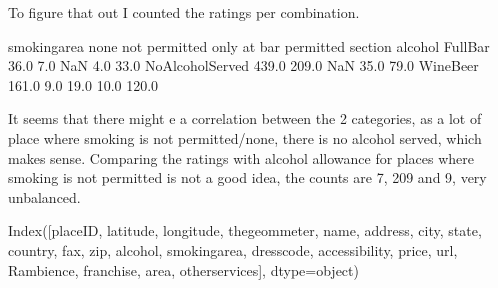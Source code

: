 \documentclass[letterpaper,10pt,english]{jupyterBook}
\begin{document}
\sphinxAtStartPar
To figure that out I counted the ratings per combination.

\begin{sphinxVerbatim}[commandchars=\\\{\}]
\PYG{p}{[}\PYG{p}{]}  
\end{sphinxVerbatim}

\begin{sphinxVerbatim}[commandchars=\\\{\}]
smoking\PYGZus{}area        none  not permitted  only at bar  permitted  section
alcohol                                                                 
Full\PYGZus{}Bar            36.0            7.0          NaN        4.0     33.0
No\PYGZus{}Alcohol\PYGZus{}Served  439.0          209.0          NaN       35.0     79.0
Wine\PYGZhy{}Beer          161.0            9.0         19.0       10.0    120.0
\end{sphinxVerbatim}

\sphinxAtStartPar
It seems that there might e a correlation between the 2 categories, as a lot of place where smoking is not permitted/none, there is no alcohol served, which makes sense.
Comparing the ratings with alcohol allowance for places where smoking is not permitted is not a good idea, the counts are 7, 209 and 9, very unbalanced.

\begin{sphinxVerbatim}[commandchars=\\\{\}]
\end{sphinxVerbatim}

\begin{sphinxVerbatim}[commandchars=\\\{\}]
Index([\PYGZsq{}placeID\PYGZsq{}, \PYGZsq{}latitude\PYGZsq{}, \PYGZsq{}longitude\PYGZsq{}, \PYGZsq{}the\PYGZus{}geom\PYGZus{}meter\PYGZsq{}, \PYGZsq{}name\PYGZsq{}, \PYGZsq{}address\PYGZsq{},
       \PYGZsq{}city\PYGZsq{}, \PYGZsq{}state\PYGZsq{}, \PYGZsq{}country\PYGZsq{}, \PYGZsq{}fax\PYGZsq{}, \PYGZsq{}zip\PYGZsq{}, \PYGZsq{}alcohol\PYGZsq{}, \PYGZsq{}smoking\PYGZus{}area\PYGZsq{},
       \PYGZsq{}dress\PYGZus{}code\PYGZsq{}, \PYGZsq{}accessibility\PYGZsq{}, \PYGZsq{}price\PYGZsq{}, \PYGZsq{}url\PYGZsq{}, \PYGZsq{}Rambience\PYGZsq{}, \PYGZsq{}franchise\PYGZsq{},
       \PYGZsq{}area\PYGZsq{}, \PYGZsq{}other\PYGZus{}services\PYGZsq{}],
      dtype=\PYGZsq{}object\PYGZsq{})
\end{sphinxVerbatim}
\end{document}
